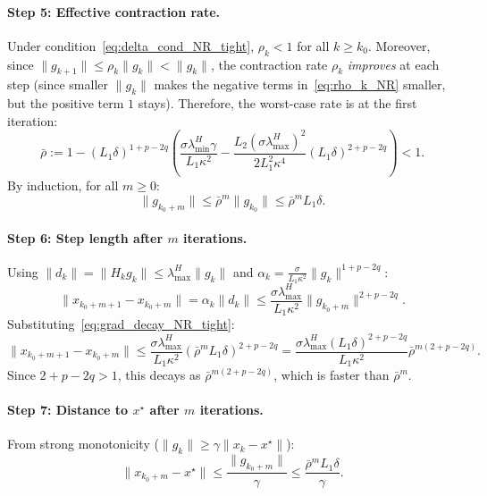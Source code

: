 \documentclass{article}
\begin{document}
\paragraph{Step 5: Effective contraction rate.} Under condition~\eqref{eq:delta_cond_NR_tight}, $\rho_k < 1$ for all $k \geq k_0$. Moreover, since $\|g_{k+1}\| \leq \rho_k\|g_k\| < \|g_k\|$, the contraction rate $\rho_k$ \emph{improves} at each step (since smaller $\|g_k\|$ makes the negative terms in~\eqref{eq:rho_k_NR} smaller, but the positive term $1$ stays). Therefore, the worst-case rate is at the first iteration:
\begin{equation}
\label{eq:rho_bar_NR}
\bar{\rho} := 1 - (L_1\delta)^{1+p-2q}\left(\frac{\sigma\lambda_{\min}^H\gamma}{L_1\kappa^2} - \frac{L_2(\sigma\lambda_{\max}^H)^2}{2L_1^2\kappa^4}(L_1\delta)^{2+p-2q}\right) < 1.
\end{equation}
By induction, for all $m \geq 0$:
\begin{equation}
\label{eq:grad_decay_NR_tight}
\|g_{k_0+m}\| \leq \bar{\rho}^m\|g_{k_0}\| \leq \bar{\rho}^m L_1\delta.
\end{equation}

\paragraph{Step 6: Step length after $m$ iterations.} Using $\|d_k\| = \|H_k g_k\| \leq \lambda_{\max}^H\|g_k\|$ and $\alpha_k = \frac{\sigma}{L_1\kappa^2}\|g_k\|^{1+p-2q}$:
\[
\|x_{k_0+m+1} - x_{k_0+m}\| = \alpha_k\|d_k\| \leq \frac{\sigma\lambda_{\max}^H}{L_1\kappa^2}\|g_{k_0+m}\|^{2+p-2q}.
\]
Substituting~\eqref{eq:grad_decay_NR_tight}:
\begin{equation}
\label{eq:step_NR_tight}
\|x_{k_0+m+1} - x_{k_0+m}\| \leq \frac{\sigma\lambda_{\max}^H}{L_1\kappa^2}(\bar{\rho}^m L_1\delta)^{2+p-2q} = \frac{\sigma\lambda_{\max}^H(L_1\delta)^{2+p-2q}}{L_1\kappa^2}\bar{\rho}^{m(2+p-2q)}.
\end{equation}
Since $2+p-2q > 1$, this decays as $\bar{\rho}^{m(2+p-2q)}$, which is faster than $\bar{\rho}^m$.

\paragraph{Step 7: Distance to $x^\star$ after $m$ iterations.} From strong monotonicity ($\|g_k\| \geq \gamma\|x_k - x^\star\|$):
\begin{equation}
\label{eq:dist_NR_tight}
\|x_{k_0+m} - x^\star\| \leq \frac{\|g_{k_0+m}\|}{\gamma} \leq \frac{\bar{\rho}^m L_1\delta}{\gamma}.
\end{equation}
\end{document}

